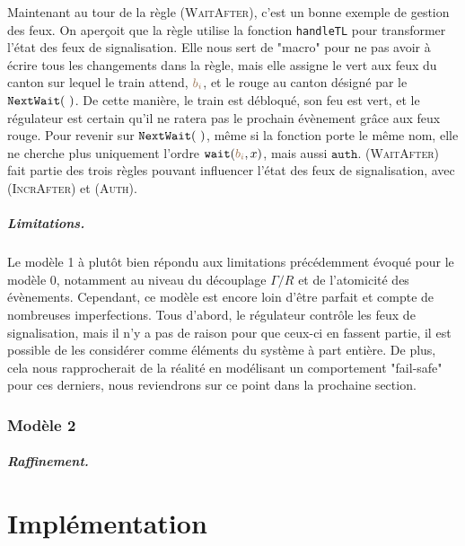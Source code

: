 \documentclass[oneside, a4paper, 11pt]{book}
\newcommand{\ruleFmt}[1]{\textsc{(#1)}}
\newcommand{\ruleDef}[1]{\hypertarget{#1}{\ruleFmt{#1}}}
\newcommand{\posFmt}[1]{{\color{poscolor}{#1}}}
\newcommand{\bid}[1]{\ensuremath{\posFmt{b_{#1}}}}
\newcommand{\authOrder}{{\mbox{\ensuremath{\mathtt{auth}}}}}
\newcommand{\wait}[2]{{\mbox{\ensuremath{\mathtt{wait}(\posFmt{#1}, #2)}}}}
\newcommand{\nextWait}[1]{\ensuremath{{\tt NextWait}(#1)}}
\begin{document}
\noindent
Maintenant au tour de la règle \ruleDef{WaitAfter}, c'est un bonne exemple de gestion des feux. On aperçoit que la règle utilise la fonction \texttt{handleTL} pour transformer l'état des feux de signalisation.
Elle nous sert de "macro" pour ne pas avoir à écrire tous les changements dans la règle, mais elle assigne le vert aux feux du canton sur lequel le train attend, \bid{i}, et le rouge au canton désigné par le \nextWait{~}.
De cette manière, le train est débloqué, son feu est vert, et le régulateur est certain qu'il ne ratera pas le prochain évènement grâce aux feux rouge.
Pour revenir sur \nextWait{~}, même si la fonction porte le même nom, elle ne cherche plus uniquement l'ordre \wait{\bid{i}}{x}, mais aussi \authOrder.
\ruleDef{WaitAfter} fait partie des trois règles pouvant influencer l'état des feux de signalisation, avec \ruleDef{IncrAfter} et \ruleDef{Auth}.

\paragraph{Limitations.}
Le modèle 1 à plutôt bien répondu aux limitations précédemment évoqué pour le modèle 0, notamment au niveau du découplage $\Gamma/R$ et de l'atomicité des évènements. Cependant, ce modèle est encore loin d'être parfait et compte de nombreuses imperfections.
Tous d'abord, le régulateur contrôle les feux de signalisation, mais il n'y a pas de raison pour que ceux-ci en fassent partie, il est possible de les considérer comme éléments du système à part entière. De plus, cela nous rapprocherait de la réalité en modélisant un comportement "fail-safe" pour ces derniers, nous reviendrons sur ce point dans la prochaine section.

\subsection{Modèle 2}
\paragraph{Raffinement.}




\chapter{Implémentation}
\label{sec:implem}
\end{document}
